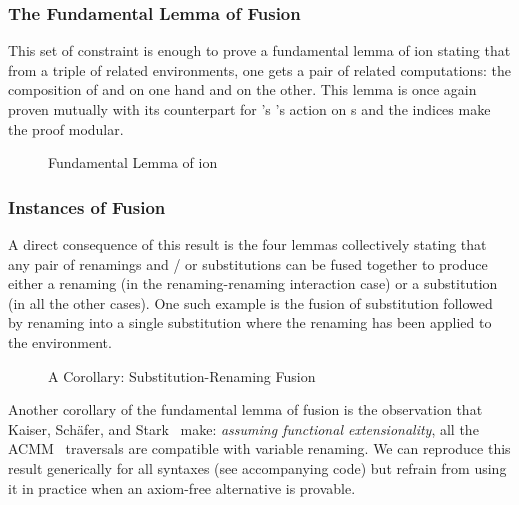 
\subsubsection{The Fundamental Lemma of Fusion}

This set of constraint is enough to prove a fundamental lemma of ion
stating that from a triple of related environments, one gets a pair of related
computations: the composition of  and  on one hand and
 on the other. This lemma is once again proven mutually with its
counterpart for 's 's action on s and the 
indices make the proof modular.

\begin{figure}[h]
\caption{Fundamental Lemma of ion}
\end{figure}

\subsubsection{Instances of Fusion}

A direct consequence of this result is the four lemmas collectively stating
that any pair of renamings and / or substitutions can be fused together to
produce either a renaming (in the renaming-renaming interaction case) or a
substitution (in all the other cases). One such example is the fusion of
substitution followed by renaming into a single substitution where the
renaming has been applied to the environment.

\begin{figure}[h]
\caption{A Corollary: Substitution-Renaming Fusion}
\end{figure}

Another corollary of the fundamental lemma of fusion is the observation that
Kaiser, Schäfer, and Stark~\citeyear{Kaiser-wsdebr} make: \emph{assuming
functional extensionality}, all the ACMM~\citeyear{allais2017type} traversals
are compatible with variable renaming. We can reproduce this result generically
for all syntaxes (see accompanying code) but refrain from using it in practice
when an axiom-free alternative is provable.



